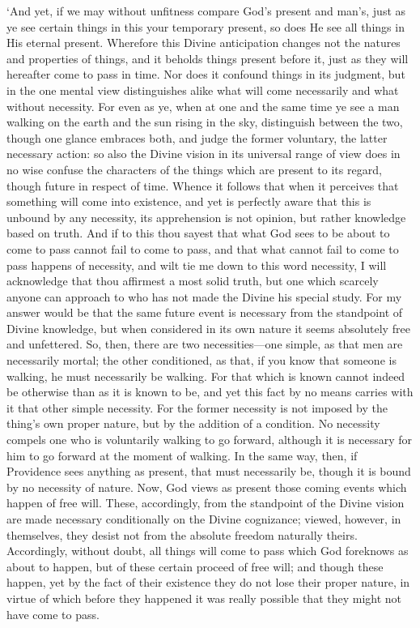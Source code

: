 \documentclass[11pt]{book}
\begin{document}
`And yet, if we may without unfitness compare God's present and man's,
just as ye see certain things in this your temporary present, so does He
see all things in His eternal present. Wherefore this Divine
anticipation changes not the natures and properties of things, and it
beholds things present before it, just as they will hereafter come to
pass in time. Nor does it confound things in its judgment, but in the
one mental view distinguishes alike what will come necessarily and what
without necessity. For even as ye, when at one and the same time ye see
a man walking on the earth and the sun rising in the sky, distinguish
between the two, though one glance embraces both, and judge the former
voluntary, the latter necessary action: so also the Divine vision in its
universal range of view does in no wise confuse the characters of the
things which are present to its regard, though future in respect of
time. Whence it follows that when it perceives that something will come
into existence, and yet is perfectly aware that this is unbound by any
necessity, its apprehension is not opinion, but rather knowledge based
on truth. And if to this thou sayest that what God sees to be about to
come to pass cannot fail to come to pass, and that what cannot fail to
come to pass happens of necessity, and wilt tie me down to this word
necessity, I will acknowledge that thou affirmest a most solid truth,
but one which scarcely anyone can approach to who has not made the
Divine his special study. For my answer would be that the same future
event is necessary from the standpoint of Divine knowledge, but when
considered in its own nature it seems absolutely free and unfettered.
So, then, there are two necessities---one simple, as that men are
necessarily mortal; the other conditioned, as that, if you know that
someone is walking, he must necessarily be walking. For that which is
known cannot indeed be otherwise than as it is known to be, and yet this
fact by no means carries with it that other simple necessity. For the
former necessity is not imposed by the thing's own proper nature, but by
the addition of a condition. No necessity compels one who is voluntarily
walking to go forward, although it is necessary for him to go forward at
the moment of walking. In the same way, then, if Providence sees
anything as present, that must necessarily be, though it is bound by no
necessity of nature. Now, God views as present those coming events which
happen of free will. These, accordingly, from the standpoint of the
Divine vision are made necessary conditionally on the Divine
cognizance; viewed, however, in themselves, they desist not from the
absolute freedom naturally theirs. Accordingly, without doubt, all
things will come to pass which God foreknows as about to happen, but of
these certain proceed of free will; and though these happen, yet by the
fact of their existence they do not lose their proper nature, in virtue
of which before they happened it was really possible that they might not
have come to pass.
\end{document}
